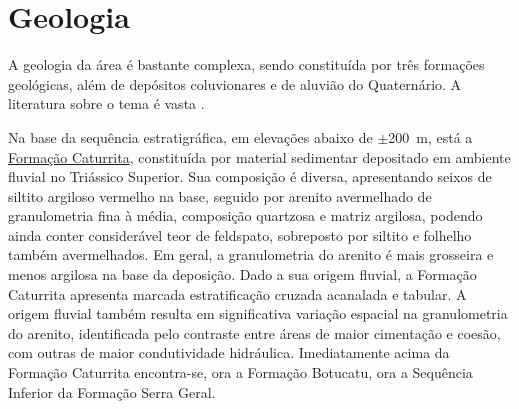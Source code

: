 \section{Geologia}

A geologia da área é bastante complexa, sendo constituída por três formações geológicas, além de depósitos coluvionares e de aluvião do Quaternário. A literatura sobre o tema é vasta \cite{Bortoluzzi1974, Brasil1980, GasparettoEtAl1988, MacielFilho1990, PieriniEtAl2002, MarquesEtAl2005, Milani2005, Pinto2005, CPRM2007, Pedron2007, Sartori2009, NascimentoEtAl2010, WerlangEtAl2010, Machado2012, PedronEtAl2012}.


Na base da sequência estratigráfica, em elevações abaixo de $\pm$200~m, está a \href{http://pt.wikipedia.org/wiki/Forma\%C3\%A7\%C3\%A3o_Caturrita}{Formação Caturrita}, constituída por material sedimentar depositado em ambiente fluvial no Triássico Superior. Sua composição é diversa, apresentando seixos de siltito argiloso vermelho na base, seguido por arenito avermelhado de granulometria fina à média, composição quartzosa e matriz argilosa, podendo ainda conter considerável teor de feldspato, sobreposto por siltito e folhelho também avermelhados. Em geral, a granulometria do arenito é mais grosseira e menos argilosa na base da deposição. Dado a sua origem fluvial, a Formação Caturrita apresenta marcada estratificação cruzada acanalada e tabular. A origem fluvial também resulta em significativa variação espacial na granulometria do arenito, identificada pelo contraste entre áreas de maior cimentação e coesão, com outras de maior condutividade hidráulica. Imediatamente acima da Formação Caturrita encontra-se, ora a Formação Botucatu, ora a Sequência Inferior da Formação Serra Geral.


